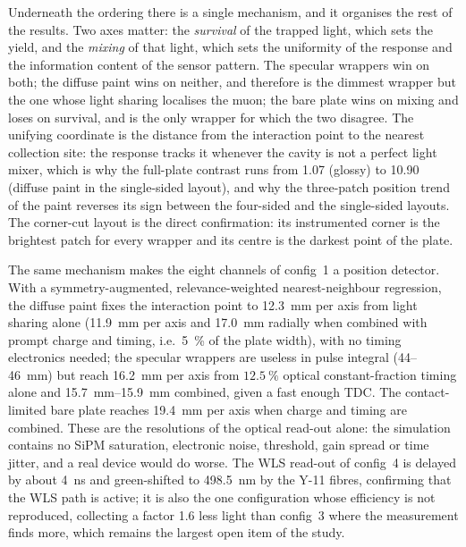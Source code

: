 \documentclass[11pt,a4paper]{article}
\begin{document}
Underneath the ordering there is a single mechanism, and it organises the rest
of the results. Two axes matter: the \emph{survival} of the trapped light,
which sets the yield, and the \emph{mixing} of that light, which sets the
uniformity of the response and the information content of the sensor pattern.
The specular wrappers win on both; the diffuse paint wins on neither, and
therefore is the dimmest wrapper but the one whose light sharing localises the
muon; the bare plate wins on mixing and loses on survival, and is the only
wrapper for which the two disagree. The unifying coordinate is the distance
from the interaction point to the nearest collection site: the response tracks
it whenever the cavity is not a perfect light mixer, which is why the full-plate
contrast runs from \num{1.07} (glossy) to \num{10.90} (diffuse paint in the
single-sided layout), and why the three-patch position trend of the paint
reverses its sign between the four-sided and the single-sided layouts. The
corner-cut layout is the direct confirmation: its instrumented corner is the
brightest patch for every wrapper and its centre is the darkest point of the
plate.

The same mechanism makes the eight channels of config~1 a position detector.
With a symmetry-augmented, relevance-weighted nearest-neighbour regression,
the diffuse paint fixes the interaction point to \SI{12.3}{\milli\meter} per
axis from light sharing alone (\SI{11.9}{\milli\meter} per axis and
\SI{17.0}{\milli\meter} radially when combined with prompt charge and timing,
i.e.\ \SI{5}{\percent} of the plate width), with no timing electronics needed;
the specular wrappers are useless in pulse integral (\num{44}--\SI{46}{\milli\meter})
but reach \SI{16.2}{\milli\meter} per axis from
$\SI{12.5}{\percent}$ optical constant-fraction timing alone and
\SI{15.7}{\milli\meter}--\SI{15.9}{\milli\meter} combined, given a fast enough
TDC. The contact-limited bare plate reaches \SI{19.4}{\milli\meter} per axis
when charge and timing are combined. These are the resolutions of the optical
read-out alone: the simulation contains no SiPM saturation, electronic noise,
threshold, gain spread or time jitter, and a real device would do worse. The WLS
read-out of config~4 is delayed by about \SI{4}{\nano\second} and green-shifted
to \SI{498.5}{\nano\meter} by the Y-11 fibres, confirming that the WLS path is
active; it is also the one configuration whose efficiency is not reproduced,
collecting a factor \num{1.6} less light than config~3 where the measurement
finds more, which remains the largest open item of the study.
\end{document}
